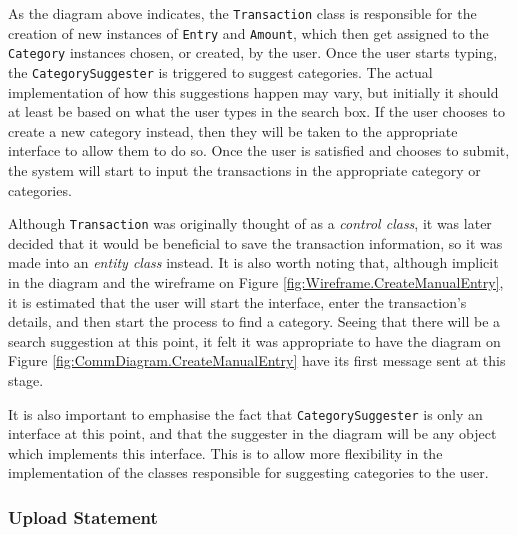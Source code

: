 As the diagram above indicates, the \texttt{Transaction} class is responsible for
the creation of new instances of \texttt{Entry} and \texttt{Amount}, which then get
assigned to the \texttt{Category} instances chosen, or created, by the user.
Once the user starts typing, the \texttt{CategorySuggester} is triggered to
suggest categories. The actual implementation of how this suggestions happen
may vary, but initially it should at least be based on what the user types in
the search box. If the user chooses to create a new category instead, then they
will be taken to the appropriate interface to allow them to do so. Once the
user is satisfied and chooses to submit, the system will start to input the
transactions in the appropriate category or categories.

Although \texttt{Transaction} was originally thought of as a \emph{control
class}, it was later decided that it would be beneficial to save the
transaction information, so it was made into an \emph{entity class} instead.
It is also worth noting that, although implicit in the diagram and the
wireframe on Figure \ref{fig:Wireframe.CreateManualEntry}, it is estimated that
the user will start the interface, enter the transaction's details, and then
start the process to find a category. Seeing that there will be a search
suggestion at this point, it felt it was appropriate to have the diagram on
Figure \ref{fig:CommDiagram.CreateManualEntry} have its first message sent at
this stage.

It is also important to emphasise the fact that \texttt{CategorySuggester} is
only an interface at this point, and that the suggester in the diagram will be
any object which implements this interface. This is to allow more flexibility
in the implementation of the classes responsible for suggesting categories to
the user.

\subsubsection{Upload Statement} \label{sec:AnalysisAndDesign.BusinessLogic.UploadStatement}


